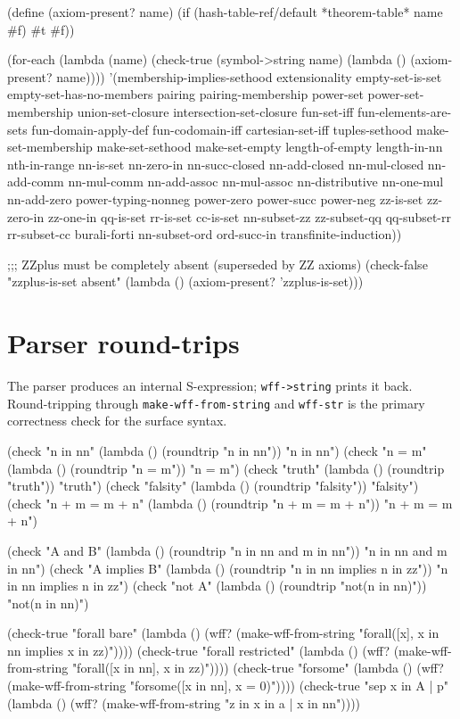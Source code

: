 \begin{VNBcode}
(define (axiom-present? name)
  (if (hash-table-ref/default *theorem-table* name #f) #t #f))

(for-each (lambda (name)
            (check-true (symbol->string name)
                        (lambda () (axiom-present? name))))
  '(membership-implies-sethood extensionality
    empty-set-is-set empty-set-has-no-members
    pairing pairing-membership
    power-set power-set-membership
    union-set-closure intersection-set-closure
    fun-set-iff fun-elements-are-sets
    fun-domain-apply-def fun-codomain-iff
    cartesian-set-iff tuples-sethood
    make-set-membership make-set-sethood make-set-empty
    length-of-empty length-in-nn nth-in-range
    nn-is-set nn-zero-in nn-succ-closed
    nn-add-closed nn-mul-closed nn-add-comm nn-mul-comm
    nn-add-assoc nn-mul-assoc nn-distributive nn-one-mul nn-add-zero
    power-typing-nonneg power-zero power-succ power-neg
    zz-is-set zz-zero-in zz-one-in
    qq-is-set rr-is-set cc-is-set
    nn-subset-zz zz-subset-qq qq-subset-rr rr-subset-cc
    burali-forti nn-subset-ord ord-succ-in transfinite-induction))

;;; ZZplus must be completely absent (superseded by ZZ axioms)
(check-false "zzplus-is-set absent"
             (lambda () (axiom-present? 'zzplus-is-set)))
\end{VNBcode}

\section{Parser round-trips}

The parser produces an internal S-expression; \texttt{wff->string} prints
it back.  Round-tripping through \texttt{make-wff-from-string} and
\texttt{wff-str} is the primary correctness check for the surface syntax.

\begin{VNBcode}
(check "n in nn"         (lambda () (roundtrip "n in nn"))         "n in nn")
(check "n = m"           (lambda () (roundtrip "n = m"))           "n = m")
(check "truth"           (lambda () (roundtrip "truth"))           "truth")
(check "falsity"         (lambda () (roundtrip "falsity"))         "falsity")
(check "n + m = m + n"   (lambda () (roundtrip "n + m = m + n"))   "n + m = m + n")

(check "A and B"         (lambda () (roundtrip "n in nn and m in nn"))
                         "n in nn and m in nn")
(check "A implies B"     (lambda () (roundtrip "n in nn implies n in zz"))
                         "n in nn implies n in zz")
(check "not A"           (lambda () (roundtrip "not(n in nn)"))    "not(n in nn)")

(check-true "forall bare"
  (lambda () (wff? (make-wff-from-string "forall([x], x in nn implies x in zz)"))))
(check-true "forall restricted"
  (lambda () (wff? (make-wff-from-string "forall([x in nn], x in zz)"))))
(check-true "forsome"
  (lambda () (wff? (make-wff-from-string "forsome([x in nn], x = 0)"))))
(check-true "sep {x in A | p}"
  (lambda () (wff? (make-wff-from-string "z in {x in a | x in nn}"))))
\end{VNBcode}

